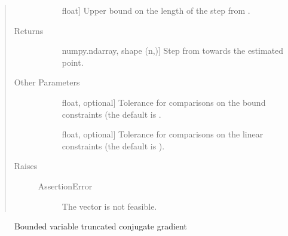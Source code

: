 \documentclass[letterpaper,10pt,english]{sphinxmanual}
\begin{document}
\begin{fulllineitems}
\begin{quote}
\begin{description}
\begin{description}
\item[{}] \leavevmode{[}float{]}
\sphinxAtStartPar
Upper bound on the length of the step from .

\end{description}

\item[{Returns}] \leavevmode\begin{description}
\item[{}] \leavevmode{[}numpy.ndarray, shape (n,){]}
\sphinxAtStartPar
Step from  towards the estimated point.

\end{description}

\item[{Other Parameters}] \leavevmode\begin{description}
\item[{}] \leavevmode{[}float, optional{]}
\sphinxAtStartPar
Tolerance for comparisons on the bound constraints (the default is
.

\item[{}] \leavevmode{[}float, optional{]}
\sphinxAtStartPar
Tolerance for comparisons on the linear constraints (the default is
).

\end{description}

\item[{Raises}] \leavevmode\begin{description}
\item[{AssertionError}] \leavevmode
\sphinxAtStartPar
The vector  is not feasible.

\end{description}

\end{description}\end{quote}


\nopagebreak

\begin{description}
\item[{{\hyperref[\detokenize{refs/generated/cobyqa.linalg.bvtcg:cobyqa.linalg.bvtcg}]{}}}] \leavevmode
\sphinxAtStartPar
Bounded variable truncated conjugate gradient


\end{description}
\end{fulllineitems}
\end{document}

